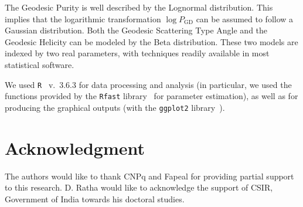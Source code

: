 \documentclass[journal]{IEEEtran}
\begin{document}
	The Geodesic Purity is well described by the Lognormal distribution.
	This implies that the logarithmic transformation $\log P_{\text{GD}}$ can be assumed to follow a Gaussian distribution.
	Both the Geodesic Scattering Type Angle and the Geodesic Helicity can be modeled by the Beta distribution.
	These two models are indexed by two real parameters, with techniques readily available in most statistical software.
	
	We used \texttt{R}~\cite{RManual} v.~3.6.3 for data processing and analysis (in particular, we used the functions provided by the \texttt{Rfast} library~\cite{Rfast} for parameter estimation), as well as for producing the graphical outputs (with the \texttt{ggplot2} library~\cite{ggplot2}).
	
	\section*{Acknowledgment}
	
	The authors would like to thank CNPq and Fapeal for providing partial support to this research. D. Ratha would like to acknowledge the support of CSIR, Government of India towards his doctoral studies.
	
	
	
	
\end{document}
